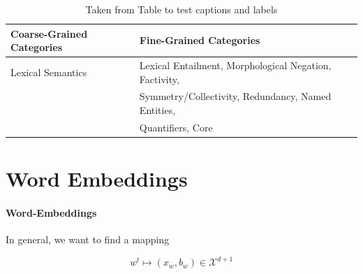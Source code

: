 \documentclass[a4paper,12pt,twoside,openright]{report}
\begin{document}
\begin{table}[h!]
\centering
\begin{tabular}{l l} 
 \hline
 Coarse-Grained Categories & Fine-Grained Categories \\ [0.5ex] 
 \hline
 Lexical Semantics & Lexical Entailment, Morphological Negation, Factivity, \\
&  Symmetry/Collectivity, Redundancy, Named Entities, \\
& Quantifiers, Core
\end{tabular}
\caption{Taken from \cite{wang19} Table to test captions and labels}
\label{table:1}
\end{table}

\paragraph{}

\section{Word Embeddings}

\paragraph{Word-Embeddings}
In general, we want to find a mapping 

\begin{equation}
w^t \mapsto (x_w, b_w) \in \mathcal{X}^{d + 1}
\end{equation}{\label{map:embedding_mapping}}
\end{document}
